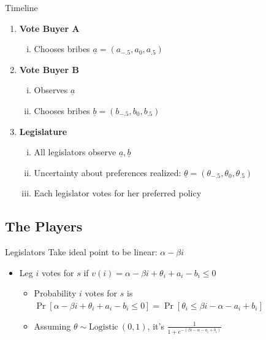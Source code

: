 \documentclass[handout]{beamer}
\newcommand{\ta}{\theta}
\newcommand{\un}{\underline}
\begin{document}
\begin{frame}{Timeline}
\pause
\begin{enumerate}[<+->]
	\item {\bfseries Vote Buyer A}
		\begin{enumerate}[i.]
			\item Chooses bribes $\un{a} = \left(a_{-.5},a_0,a_{.5}\right)$
		\end{enumerate}
	\item \textbf{Vote Buyer B}
		\begin{enumerate}[i.]
			\item Observes $\un{a}$
			\item Chooses bribes $\un{b} = \left(b_{-.5},b_0,b_{.5}\right)$
		\end{enumerate}
	\item \textbf{Legislature}
		\begin{enumerate}[i.]
			\item All legislators observe $\un{a},\un{b}$
			\item Uncertainty about preferences realized: $\un{\ta} = \left(\ta_{-.5},\ta_0,\ta_{.5}\right)$
			\item Each legislator votes for her preferred policy 
		\end{enumerate}
\end{enumerate}
\end{frame}


\subsection{The Players}

\begin{frame}{Legislators}
\pause
Take ideal point to be linear: $\alpha - \beta i$
\pause
\begin{itemize}[<+->]
	\item Leg $i$ votes for $s$ if $v(i) = \alpha -\beta i + \ta_i + a_i - b_i \leq 0$
		\begin{itemize}
			\item Probability $i$ votes for $s$ is $\Pr\left[\alpha -\beta i + \ta_i + a_i - b_i \leq 0 \right] = \Pr\left[\ta_i \leq \beta i - \alpha - a_i + b_i \right] $
			\item Assuming $\ta \sim \text{Logistic} \ (0,1)$, it's $\frac{1}{1+e^{-\left(\beta i - \alpha - a_i + b_i \right)}}$ 
		\end{itemize}
\end{itemize}


\end{frame}
\end{document}
